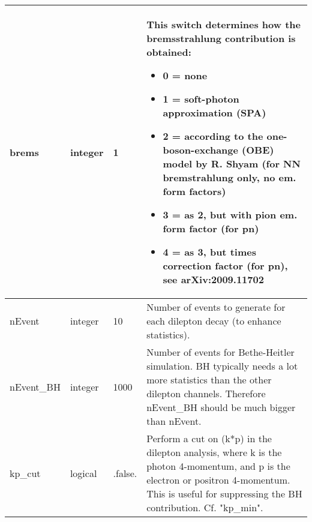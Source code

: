 \documentclass{article}
\begin{document}
\begin{longtable}{llll}
\midrule
brems & \begin{minipage}[t]{2cm}integer\end{minipage} & \begin{minipage}[t]{2cm}1\end{minipage} & \begin{minipage}[t]{12cm}This switch determines how the bremsstrahlung contribution is obtained:\begin{itemize}\leftmargin0em\itemindent0pt\item 0 = none\item 1 = soft-photon approximation (SPA)\item 2 = according to the one-boson-exchange (OBE) model by R. Shyam       (for NN bremstrahlung only, no em. form factors)\item 3 = as 2, but with pion em. form factor (for pn)\item 4 = as 3, but times correction factor (for pn), see arXiv:2009.11702\end{itemize}\end{minipage}\\*
\midrule
nEvent & \begin{minipage}[t]{2cm}integer\end{minipage} & \begin{minipage}[t]{2cm}10\end{minipage} & \begin{minipage}[t]{12cm}Number of events to generate for each dilepton decay (to enhance statistics).\end{minipage}\\*
\midrule
nEvent\_BH & \begin{minipage}[t]{2cm}integer\end{minipage} & \begin{minipage}[t]{2cm}1000\end{minipage} & \begin{minipage}[t]{12cm}Number of events for Bethe-Heitler simulation. BH typically needs a lot more statistics than the other dilepton channels. Therefore nEvent\_BH should be much bigger than nEvent.\end{minipage}\\*
\midrule
kp\_cut & \begin{minipage}[t]{2cm}logical\end{minipage} & \begin{minipage}[t]{2cm}.false.\end{minipage} & \begin{minipage}[t]{12cm}Perform a cut on (k*p) in the dilepton analysis, where k is the photon 4-momentum, and p is the electron or positron 4-momentum. This is useful for suppressing the BH contribution. Cf. "kp\_min".\end{minipage}\\*

\end{longtable}
\end{document}
